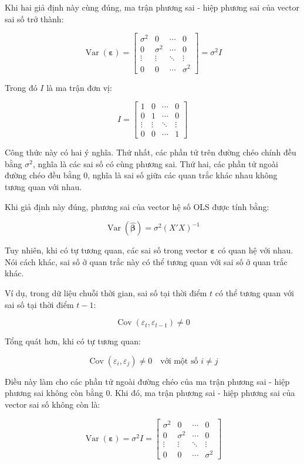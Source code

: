 Khi hai giả định này cùng đúng, ma trận phương sai - hiệp phương sai của vector sai số trở thành:

\[
\operatorname{Var}(\boldsymbol{\varepsilon})
=
\begin{bmatrix}
\sigma^2 & 0 & \cdots & 0 \\
0 & \sigma^2 & \cdots & 0 \\
\vdots & \vdots & \ddots & \vdots \\
0 & 0 & \cdots & \sigma^2
\end{bmatrix} = \sigma^2 I
\] 

Trong đó \(I\) là ma trận đơn vị:

\[
I
=
\begin{bmatrix}
1 & 0 & \cdots & 0 \\
0 & 1 & \cdots & 0 \\
\vdots & \vdots & \ddots & \vdots \\
0 & 0 & \cdots & 1
\end{bmatrix}
\]

Công thức này có hai ý nghĩa. Thứ nhất, các phần tử trên đường chéo chính đều bằng \(\sigma^2\), nghĩa là các sai số có cùng phương sai. Thứ hai, các phần tử ngoài đường chéo đều bằng 0, nghĩa là sai số giữa các quan trắc khác nhau không tương quan với nhau.

Khi giả định này đúng, phương sai của vector hệ số OLS được tính bằng:

\[
\operatorname{Var}(\hat{\boldsymbol{\beta}})
=
\sigma^2(X'X)^{-1}
\]

Tuy nhiên, khi có tự tương quan, các sai số trong vector \(\boldsymbol{\varepsilon}\) có quan hệ với nhau. Nói cách khác, sai số ở quan trắc này có thể tương quan với sai số ở quan trắc khác.

Ví dụ, trong dữ liệu chuỗi thời gian, sai số tại thời điểm \(t\) có thể tương quan với sai số tại thời điểm \(t-1\):

\[
\operatorname{Cov}(\varepsilon_t,\varepsilon_{t-1}) \neq 0
\]

Tổng quát hơn, khi có tự tương quan:

\[
\operatorname{Cov}(\varepsilon_i,\varepsilon_j) \neq 0
\quad \text{với một số } i \neq j
\]

Điều này làm cho các phần tử ngoài đường chéo của ma trận phương sai - hiệp phương sai không còn bằng 0. Khi đó, ma trận phương sai - hiệp phương sai của vector sai số không còn là:

\[
\operatorname{Var}(\boldsymbol{\varepsilon})
=
\sigma^2 I
=
\begin{bmatrix}
\sigma^2 & 0 & \cdots & 0 \\
0 & \sigma^2 & \cdots & 0 \\
\vdots & \vdots & \ddots & \vdots \\
0 & 0 & \cdots & \sigma^2
\end{bmatrix}
\]

